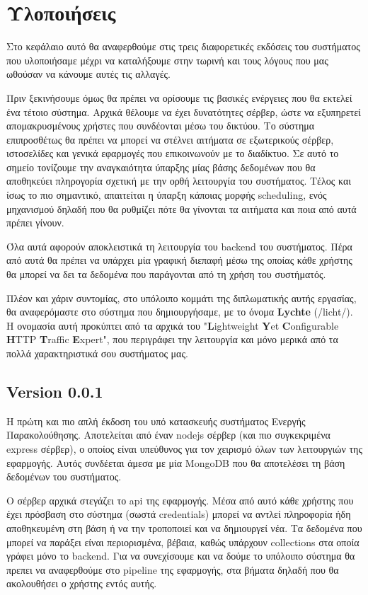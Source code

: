 \chapter{Υλοποιήσεις}
\label{chapter:implementations}

Στο κεφάλαιο αυτό θα αναφερθούμε στις τρεις διαφορετικές εκδόσεις του συστήματος που
υλοποιήσαμε μέχρι να καταλήξουμε στην τωρινή και τους λόγους που μας ωθούσαν να κάνουμε αυτές τις αλλαγές.

Πριν ξεκινήσουμε όμως θα πρέπει να ορίσουμε τις βασικές ενέργειες που θα εκτελεί ένα τέτοιο σύστημα.
Αρχικά θέλουμε να έχει δυνατότητες σέρβερ, ώστε να εξυπηρετεί απομακρυσμένους χρήστες που συνδέονται μέσω του δικτύου.
Το σύστημα επιπροσθέτως θα πρέπει να μπορεί να στέλνει αιτήματα σε εξωτερικούς σέρβερ, ιστοσελίδες και γενικά
εφαρμογές που επικοινωνούν με το διαδίκτυο. Σε αυτό το σημείο τονίζουμε την αναγκαιότητα ύπαρξης μίας βάσης δεδομένων που θα αποθηκεύει
πληρογορία σχετική με την ορθή λειτουργία του συστήματος. Τέλος και ίσως το πιο σημαντικό, απαιτείται η ύπαρξη κάποιας
μορφής scheduling, ενός μηχανισμού δηλαδή που θα ρυθμίζει πότε θα γίνονται τα αιτήματα και ποια από αυτά πρέπει γίνουν.

Όλα αυτά αφορούν αποκλειστικά τη λειτουργία του backend του συστήματος. Πέρα από αυτά
θα πρέπει να υπάρχει μία γραφική διεπαφή μέσω της οποίας κάθε χρήστης θα μπορεί να δει τα δεδομένα που παράγονται
από τη χρήση του συστήματός.

Πλέον και χάριν συντομίας, στο υπόλοιπο κομμάτι της διπλωματικής αυτής εργασίας, θα αναφερόμαστε
στο σύστημα που δημιουργήσαμε, με το όνομα \textbf{Lychte} (/licht/). Η ονομασία αυτή προκύπτει από τα αρχικά του "\textbf{L}ightweight
\textbf{Y}et \textbf{C}onfigurable \textbf{H}ΤTP \textbf{T}raffic \textbf{E}xpert", που περιγράφει την λειτουργία και μόνο
μερικά από τα πολλά χαρακτηριστικά σου συστήματος μας.

\section{Version 0.0.1}
\label{section:first_implementation}

Η πρώτη και πιο απλή έκδοση του υπό κατασκευής συστήματος Ενεργής Παρακολούθησης. Αποτελείται από έναν
nodejs σέρβερ (και πιο συγκεκριμένα express σέρβερ), ο οποίος είναι υπεύθυνος για τον χειρισμό όλων των λειτουργιών της εφαρμογής. Αυτός συνδέεται
άμεσα με μία MongoDB που θα αποτελέσει τη βάση δεδομένων του συστήματος.

Ο σέρβερ αρχικά στεγάζει το api της εφαρμογής. Μέσα από αυτό κάθε χρήστης που έχει πρόσβαση στο σύστημα (σωστά credentials)
μπορεί να αντλεί πληροφορία ήδη αποθηκευμένη στη βάση ή να την τροποποιεί και να δημιουργεί νέα. Τα δεδομένα που μπορεί να παράξει
είναι περιορισμένα, βέβαια, καθώς υπάρχουν collections στα οποία γράφει μόνο το backend. Για να συνεχίσουμε και να δούμε το υπόλοιπο σύστημα
θα πρεπει να αναφερθούμε στο pipeline της εφαρμογής, στα βήματα δηλαδή που θα ακολουθήσει ο χρήστης εντός αυτής.

